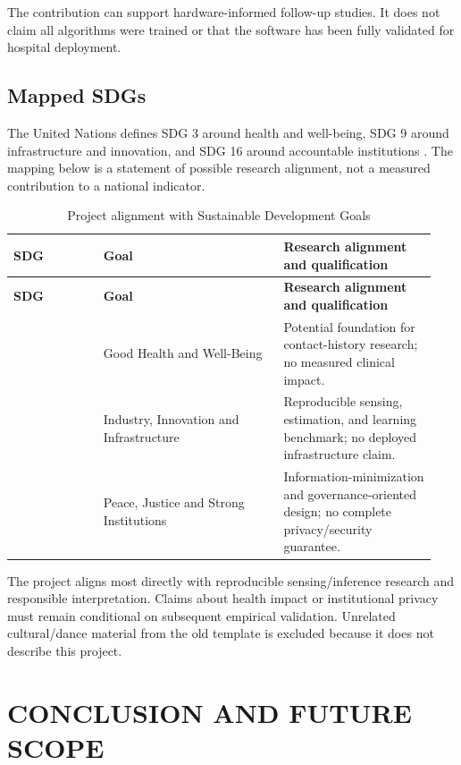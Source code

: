 \documentclass[12pt,a4paper]{report}
\begin{document}
The contribution can support hardware-informed follow-up studies. It does not claim all algorithms were trained or that the software has been fully validated for hospital deployment.

\section{Mapped SDGs}
The United Nations defines SDG 3 around health and well-being, SDG 9 around infrastructure and innovation, and SDG 16 around accountable institutions \cite{ref18}. The mapping below is a statement of possible research alignment, not a measured contribution to a national indicator.

\begingroup
\small{}\setlength{\tabcolsep}{3pt}
\begin{longtable}{>{\raggedright\arraybackslash}p{0.200\linewidth}>{\raggedright\arraybackslash}p{0.400\linewidth}>{\raggedright\arraybackslash}p{0.340\linewidth}}
\caption{Project alignment with Sustainable Development Goals}\label{tab:sdg}\\
\toprule
\textbf{SDG} & \textbf{Goal} & \textbf{Research alignment and qualification}\\
\midrule
\endfirsthead
\toprule
\textbf{SDG} & \textbf{Goal} & \textbf{Research alignment and qualification}\\
\midrule
\endhead
\bottomrule
\endfoot
3 & Good Health and Well-Being & Potential foundation for contact-history research; no measured clinical impact.\\
9 & Industry, Innovation and Infrastructure & Reproducible sensing, estimation, and learning benchmark; no deployed infrastructure claim.\\
16 & Peace, Justice and Strong Institutions & Information-minimization and governance-oriented design; no complete privacy/\allowbreak{}security guarantee.\\
\end{longtable}
\endgroup


The project aligns most directly with reproducible sensing/inference research and responsible interpretation. Claims about health impact or institutional privacy must remain conditional on subsequent empirical validation. Unrelated cultural/dance material from the old template is excluded because it does not describe this project.

\chapter{CONCLUSION AND FUTURE SCOPE}
\end{document}
